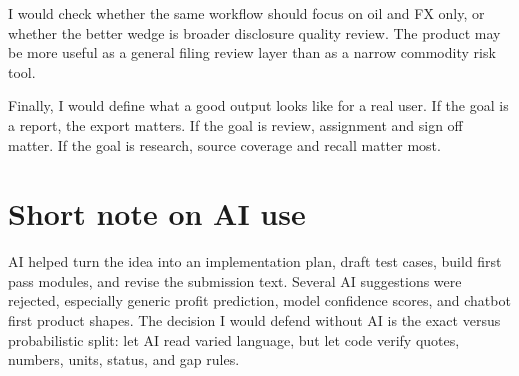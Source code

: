 \documentclass[10pt]{article}
\begin{document}
I would check whether the same workflow should focus on oil and FX only, or whether the better wedge is broader disclosure quality review. The product may be more useful as a general filing review layer than as a narrow commodity risk tool.

Finally, I would define what a good output looks like for a real user. If the goal is a report, the export matters. If the goal is review, assignment and sign off matter. If the goal is research, source coverage and recall matter most.

\section{Short note on AI use}

AI helped turn the idea into an implementation plan, draft test cases, build first pass modules, and revise the submission text. Several AI suggestions were rejected, especially generic profit prediction, model confidence scores, and chatbot first product shapes. The decision I would defend without AI is the exact versus probabilistic split: let AI read varied language, but let code verify quotes, numbers, units, status, and gap rules.
\end{document}
